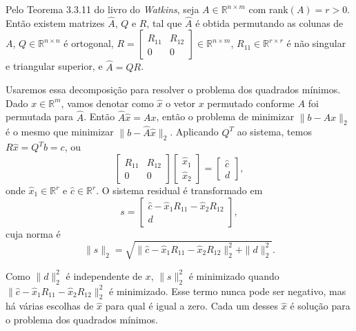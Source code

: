 \documentclass[a4paper,11pt]{article}
\begin{document}
            Pelo Teorema 3.3.11 do livro do \textit{Watkins}, seja $A \in \mathbb{R}^{n \times m}$ com rank$(A)=r>0$. Então existem matrizes $\hat{A}$, $Q$ e $R$, tal que $\hat{A}$ é obtida permutando as colunas de $A$, $Q \in \mathbb{R}^{n \times n}$ é ortogonal, $R = \begin{bmatrix} R_{11} & R_{12} \\ 0 & 0 \end{bmatrix} \in \mathbb{R}^{n \times m}$, $R_{11} \in \mathbb{R}^{r \times r}$ é não singular e triangular superior, e $\hat{A}=QR$. 
            
            Usaremos essa decomposição para resolver o problema dos quadrados mínimos. Dado $x \in \mathbb{R}^{m}$, vamos denotar como $\hat{x}$ o vetor $x$ permutado conforme $A$ foi permutada para $\hat{A}$. Então $\hat{A}\hat{x}=Ax$, então o problema de minimizar $\|b-Ax\|_2$ é o mesmo que minimizar $\|b-\hat{A}\hat{x}\|_2$. Aplicando $Q^T$ ao sistema, temos $R\hat{x}=Q^Tb=c$, ou
            $$
                \begin{bmatrix} 
                    R_{11} & R_{12} \\
                    0 & 0 
                \end{bmatrix}
                \begin{bmatrix} 
                    \hat{x}_1 \\
                    \hat{x}_2 
                \end{bmatrix}
                =
                \begin{bmatrix} 
                    \hat{c} \\
                    d
                \end{bmatrix},
            $$
            onde $\hat{x}_1 \in \mathbb{R}^r$ e $\hat{c} \in \mathbb{R}^r$. O sistema residual é transformado em 
            $$
                s =
                \begin{bmatrix} 
                    \hat{c} - \hat{x}_1 R_{11} - \hat{x}_2 R_{12} \\
                    d 
                \end{bmatrix},
            $$
            cuja norma é
            $$
                \|s\|_2 = \sqrt{\| \hat{c} - \hat{x}_1 R_{11} - \hat{x}_2 R_{12} \|_2^2 + \|d\|_2^2}.
            $$
            
            Como $\|d\|^2_2$ é independente de $x$, $\|s\|^2_2$ é minimizado quando $\| \hat{c} - \hat{x}_1 R_{11} - \hat{x}_2 R_{12} \|_2^2$ é minimizado. Esse termo nunca pode ser negativo, mas há várias escolhas de $\hat{x}$ para qual é igual a zero. Cada um desses $\hat{x}$ é  solução para o problema dos quadrados mínimos. 
        
\end{document}
